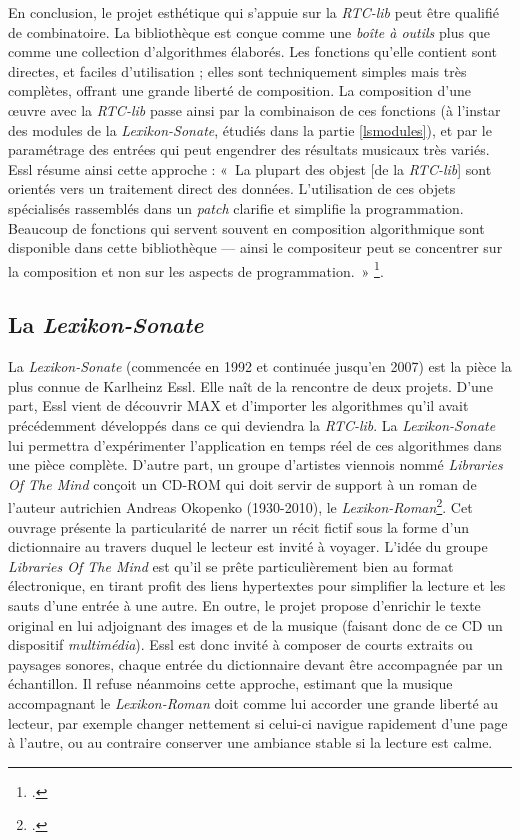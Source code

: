 \documentclass[a4paper,12pt]{article}
\newcommand{\guill}[1]{«~#1~»}
\begin{document}
En conclusion, le projet esthétique qui s'appuie sur la \emph{RTC-lib} peut être qualifié de combinatoire. La bibliothèque est conçue comme une \emph{boîte à outils} plus que comme une collection d'algorithmes élaborés. Les fonctions qu'elle contient sont directes, et faciles d'utilisation ; elles sont techniquement simples mais très complètes, offrant une grande liberté de composition. La composition d'une œuvre avec la \emph{RTC-lib} passe ainsi par la combinaison de ces fonctions (à l'instar des modules de la \emph{Lexikon-Sonate}, étudiés dans la partie \ref{lsmodules}), et par le paramétrage des entrées qui peut engendrer des résultats musicaux très variés. Essl résume ainsi cette approche : \guill{La plupart des objest [de la \emph{RTC-lib}] sont orientés vers un traitement direct des données. L'utilisation de ces objets spécialisés rassemblés dans un \emph{patch} clarifie et simplifie la programmation. Beaucoup de fonctions qui servent souvent en composition algorithmique sont disponible dans cette bibliothèque --- ainsi le compositeur peut se concentrer sur la composition et non sur les aspects de programmation.}
\footnote{\cite{essl2010rtc}.}.


\subsection{La \emph{Lexikon-Sonate}}
\label{lalexikonsonate}

La \emph{Lexikon-Sonate} (commencée en 1992 et continuée jusqu'en 2007) est la pièce la plus connue de Karlheinz Essl. Elle naît de la rencontre de deux projets. D'une part, Essl vient de découvrir MAX et d'importer les algorithmes qu'il avait précédemment développés dans ce qui deviendra la \emph{RTC-lib}. La \emph{Lexikon-Sonate} lui permettra d'expérimenter l'application en temps réel de ces algorithmes dans une pièce complète. D'autre part, un groupe d'artistes viennois nommé \emph{Libraries Of The Mind} conçoit un CD-ROM qui doit servir de support à un roman de l'auteur autrichien Andreas Okopenko (1930-2010), le \emph{Lexikon-Roman}\footnote{\cite{okopenko1983lexikon}.}. Cet ouvrage présente la particularité de narrer un récit fictif sous la forme d'un dictionnaire au travers duquel le lecteur est invité à voyager. L'idée du groupe \emph{Libraries Of The Mind} est qu'il se prête particulièrement bien au format électronique, en tirant profit des liens hypertextes pour simplifier la lecture et les sauts d'une entrée à une autre. En outre, le projet propose d'enrichir le texte original en lui adjoignant des images et de la musique (faisant donc de ce CD un dispositif \emph{multimédia}). Essl est donc invité à composer de courts extraits ou paysages sonores, chaque entrée du dictionnaire devant être accompagnée par un échantillon. Il refuse néanmoins cette approche, estimant que la musique accompagnant le \emph{Lexikon-Roman} doit comme lui accorder une grande liberté au lecteur, par exemple changer nettement si celui-ci navigue rapidement d'une page à l'autre, ou au contraire conserver une ambiance stable si la lecture est calme.
\end{document}
